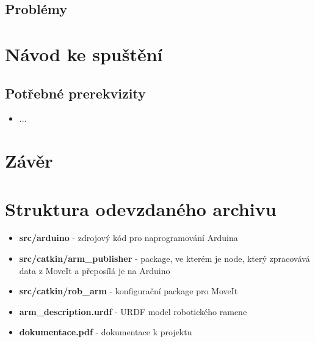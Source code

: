\documentclass[a4paper,11pt]{article}
\begin{document}
\subsection{Problémy}



\section{Návod ke spuštění}
\subsection{Potřebné prerekvizity}
\begin{itemize}
	\item ...

\end{itemize}


\section{Závěr}


\section{Struktura odevzdaného archivu}
\begin{itemize}
	\item \textbf{src/arduino} - zdrojový kód pro naprogramování Arduina
	\item \textbf{src/catkin/arm\_publisher} - package, ve kterém je node, který zpracovává data z
	MoveIt a přeposílá je na Arduino
	\item \textbf{src/catkin/rob\_arm} - konfigurační package pro MoveIt
	\item \textbf{arm\_description.urdf} - URDF model robotického ramene
	\item \textbf{dokumentace.pdf} - dokumentace k projektu
\end{itemize}

\fi
\end{document}
